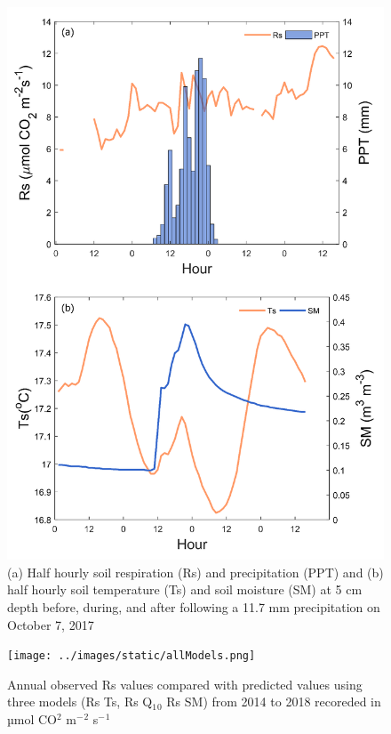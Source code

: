 \documentclass[]{elsarticle} %
\makeatletter
\def\maxwidth{\ifdim\Gin@nat@width>\linewidth\linewidth
\else\Gin@nat@width\fi}
\let\Oldincludegraphics\includegraphics
\renewcommand{\includegraphics}[1]{\Oldincludegraphics[width=\maxwidth]{#1}}
\makeatother
\begin{document}
\begin{figure}
\centering
\includegraphics{../images/static/rainEvent2017.png}
\caption{(a) Half hourly soil respiration (Rs) and precipitation (PPT)
and (b) half hourly soil temperature (Ts) and soil moisture (SM) at 5 cm
depth before, during, and after following a 11.7 mm precipitation on
October 7, 2017 \label{fig:rainEvent2017}}
\end{figure}

\begin{figure}
\centering
\texttt{[image: ../images/static/allModels.png]}
\caption{Annual observed Rs values compared with predicted values using
three models (Rs Ts, Rs Q\(_1\)\(_0\) Rs SM) from 2014 to 2018 recoreded
in µmol CO\(^2\) m\(^-\)\(^2\) s\(^-\)\(^1\) \label{fig:rsEstTest}}
\end{figure}
\end{document}
